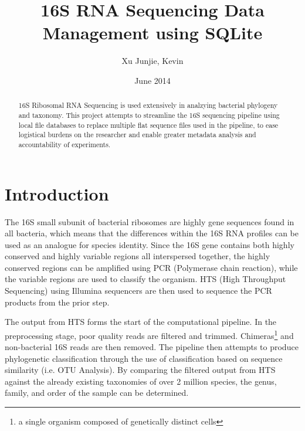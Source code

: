 \documentclass[12pt]{article}
\begin{document}
	\title{16S RNA Sequencing Data Management using SQLite}
	\author{Xu Junjie, Kevin}
	\date{June 2014}
	\maketitle
	\begin{abstract}
		16S Ribosomal RNA Sequencing is used extensively in analzying bacterial
		phylogeny and taxonomy. This project attempts to streamline the 16S sequencing
		pipeline using local file databases to replace multiple flat sequence files used
		in the pipeline, to ease logistical burdens on the researcher and enable 
		greater metadata analysis and accountability of experiments.
	\end{abstract}
	\tableofcontents
	\section{Introduction} %
	\label{sec:introduction}
	The 16S small subunit of bacterial ribosomes are highly gene sequences found in all bacteria, which means that the differences within the 16S RNA profiles can be used as an analogue for species identity. Since the 16S gene contains both highly conserved and highly variable regions all interspersed together,
	the highly conserved regions can be amplified using PCR (Polymerase chain reaction), while the variable regions are used to classify the organism. HTS (High Throughput Sequencing) using Illumina sequencers are then used to sequence the PCR products from the prior step.

	The output from HTS forms the start of the computational pipeline. In the preprocessing stage, poor quality reads are filtered and trimmed. 
	Chimeras\footnote{a single organism composed of genetically distinct cells} and non-bacterial 16S reads are then removed. 
	The pipeline then attempts to produce phylogenetic classification through the use of classification based on sequence similarity (i.e. OTU Analysis). By comparing the filtered output from HTS against the already existing taxonomies of over 2 million species, the genus, family, and order of the sample can be determined.

\end{document}
